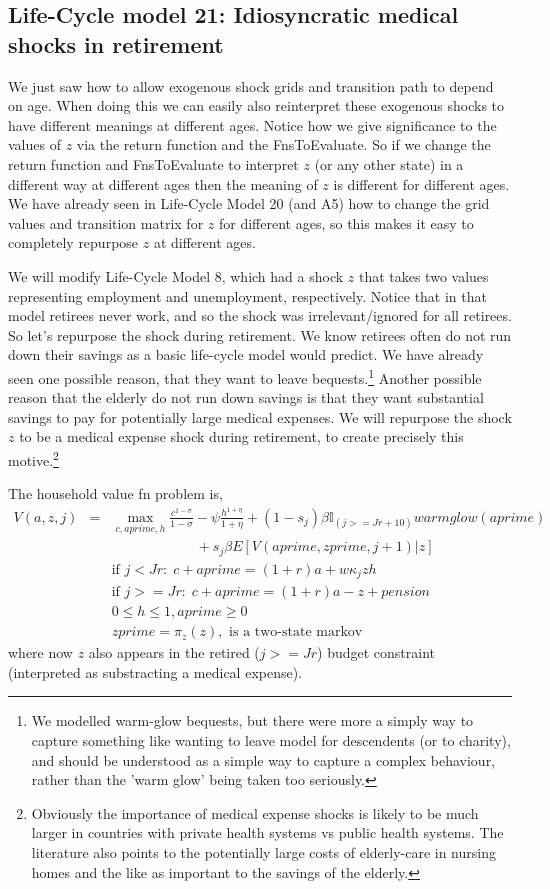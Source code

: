 \subsection{Life-Cycle model 21: Idiosyncratic medical shocks in retirement}
We just saw how to allow exogenous shock grids and transition path to depend on age. When doing this we can easily also reinterpret these exogenous shocks to have different meanings at different ages. Notice how we give significance to the values of $z$ via the return function and the FnsToEvaluate. So if we change the return function and FnsToEvaluate to interpret $z$ (or any other state) in a different way at different ages then the meaning of $z$ is different for different ages. We have already seen in Life-Cycle Model 20 (and A5) how to change the grid values and transition matrix for $z$ for different ages, so this makes it easy to completely repurpose $z$ at different ages.

We will modify Life-Cycle Model 8, which had a shock $z$ that takes two values representing employment and unemployment, respectively. Notice that in that model retirees never work, and so the shock was irrelevant/ignored for all retirees. So let's repurpose the shock during retirement. We know retirees often do not run down their savings as a basic life-cycle model would predict. We have already seen one possible reason, that they want to leave bequests.\footnote{We modelled warm-glow bequests, but there were more a simply way to capture something like wanting to leave model for descendents (or to charity), and should be understood as a simple way to capture a complex behaviour, rather than the 'warm glow' being taken too seriously.} Another possible reason that the elderly do not run down savings is that they want substantial savings to pay for potentially large medical expenses. We will repurpose the shock $z$ to be a medical expense shock during retirement, to create precisely this motive.\footnote{Obviously the importance of medical expense shocks is likely to be much larger in countries with private health systems vs public health systems. The literature also points to the potentially large costs of elderly-care in nursing homes and the like as important to the savings of the elderly.}

The household value fn problem is,
\begin{eqnarray*}
 V(a,z,j)&=& \max_{c,aprime,h} \frac{c^{1-\sigma}}{1-\sigma} - \psi \frac{h^{1+\eta}}{1+\eta} + (1-s_j)\beta   \mathbb{I}_{(j>=Jr+10)} warmglow(aprime)   \\
 && \quad \quad \quad \quad \quad \quad + s_j \beta E[V(aprime,zprime,j+1)|z] \\
&& \text{if }j<Jr: \; c+aprime=(1+r)a+w \kappa_j z h \\
&& \text{if }j>=Jr: \; c+aprime=(1+r)a -z +pension\\
&& 0\leq h \leq 1, aprime\geq 0 \\
&& zprime=\pi_z(z), \text{  is a two-state markov}
\end{eqnarray*}
where now $z$ also appears in the retired ($j>=Jr$) budget constraint (interpreted as substracting a medical expense).

